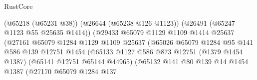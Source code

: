 \begin{lexlean}{RustCore}
\begin{coremodule}
                                                (@65218 (@65231 @38))
                                                (@26644 (@65238 @126 @1123))
                                                (@26491 (@65247 @1123 @55 @25635 @1414))
                                                (@29433
                                                  @65079
                                                  @1129
                                                  @1109
                                                  @1414
                                                  @25637
                                                  (@27161
                                                    @65079
                                                    @1284
                                                    @1129
                                                    @1109
                                                    @25637
                                                    (@65026
                                                      @65079
                                                      @1284
                                                      @95
                                                      @141
                                                      @586
                                                      @139
                                                      @12751
                                                      @1454
                                                      (@65133
                                                        @1127
                                                        @586
                                                        @873
                                                        @12751
                                                        (@1379 @1454 @1387)
                                                        (@65141 @12751 @65144 @44965)
                                                        (@65132
                                                          @141
                                                          @80
                                                          @139
                                                          @14
                                                          @1454
                                                          @1387
                                                          (@27170
                                                            @65079
                                                            @1284
                                                            @137

\end{coremodule}
\end{lexlean}
